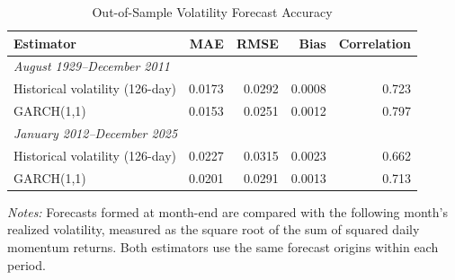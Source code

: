 \begin{table}[htbp]
\centering
\caption{Out-of-Sample Volatility Forecast Accuracy}
\label{tab:garch_forecast_accuracy}
\small
\begin{tabular}{lrrrr}
\toprule
Estimator & MAE & RMSE & Bias & Correlation \\
\midrule
\multicolumn{5}{l}{\textit{August 1929--December 2011}} \\
Historical volatility (126-day) & 0.0173 & 0.0292 & 0.0008 & 0.723 \\
GARCH(1,1) & 0.0153 & 0.0251 & 0.0012 & 0.797 \\
\midrule
\multicolumn{5}{l}{\textit{January 2012--December 2025}} \\
Historical volatility (126-day) & 0.0227 & 0.0315 & 0.0023 & 0.662 \\
GARCH(1,1) & 0.0201 & 0.0291 & 0.0013 & 0.713 \\
\bottomrule
\end{tabular}
\par\vspace{0.3em}
\begin{minipage}{0.9\linewidth}
\footnotesize\textit{Notes:} Forecasts formed at month-end are compared with the following month's realized volatility, measured as the square root of the sum of squared daily momentum returns. Both estimators use the same forecast origins within each period.
\end{minipage}
\end{table}
